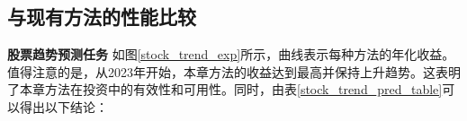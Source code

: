 \subsection{与现有方法的性能比较}

\textbf{股票趋势预测任务} 如图\ref{stock_trend_exp}所示，曲线表示每种方法的年化收益。值得注意的是，从2023年开始，本章方法的收益达到最高并保持上升趋势。这表明了本章方法在投资中的有效性和可用性。同时，由表\ref{stock_trend_pred_table}可以得出以下结论：


